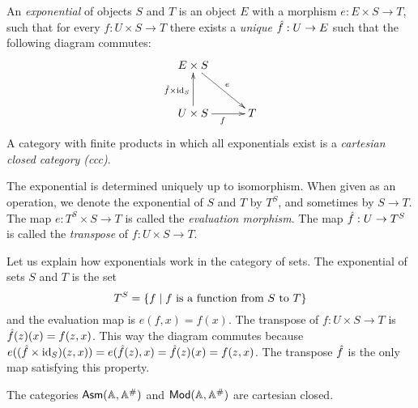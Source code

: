 \begin{definition}
  An \emph{exponential} of objects $S$ and $T$ is an object $E$ with a
  morphism $e : E \times S \to T$, such that for every $f : U \times S
  \to T$ there exists a \emph{unique} $\hat{f} : U \to E$ such that
  the following diagram commutes:
  \begin{equation*}
    \xymatrix@+0.5em{
      {E \times S}
      \ar[rd]^{e}
      &
      \\
      {U \times S}
      \ar[r]_{f}
      \ar[u]^{\curry{f} \times \id_S}
      &
      {T}
    }
  \end{equation*}
  A category with finite products in which all exponentials exist is a
  \emph{cartesian closed category (ccc)}.
\end{definition}

\noindent
%
The exponential is determined uniquely up to isomorphism. When given
as an operation, we denote the exponential of $S$ and $T$ by $T^S$,
and sometimes by $S \to T$. The map $e : T^S \times S \to T$ is called
the \emph{evaluation morphism}. The map $\hat{f} : U \to T^S$ is
called the \emph{transpose} of $f : U \times S \to T$.

Let us explain how exponentials work in the category of sets. The
exponential of sets $S$ and $T$ is the set
%
\begin{equation*}
  T^S = \{f \mid \text{$f$ is a function from $S$ to $T$}\}
\end{equation*}
%
and the evaluation map is $e(f,x) = f(x)$. The transpose of $f : U
\times S \to T$ is $\hat{f}(z)(x) = f (z, x)$. This way the diagram
commutes because $e((\hat{f} \times \mathrm{id}_S)(z, x)) = e(\hat{f}(z),
x) = \hat{f}(z)(x) = f(z,x)$. The transpose $\hat{f}$ is the only
map satisfying this property.

\begin{proposition}
  \label{prop:asm-ccc}%
  The categories $\mathsf{Asm}(\mathbb{A},\mathbb{A}^{\#})$ and $\mathsf{Mod}(\mathbb{A},\mathbb{A}^{\#})$ are cartesian closed.
\end{proposition}


